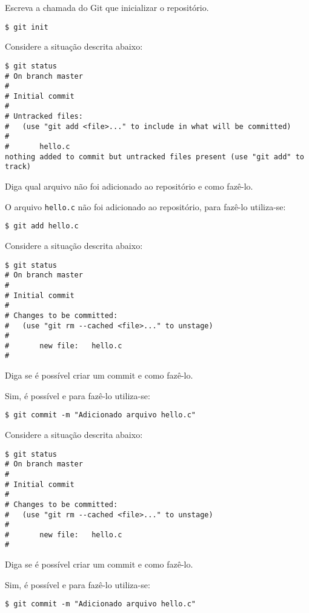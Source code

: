 \begin{Exercise}[label={0008}, difficulty={1}, origin={git}]
  Escreva a chamada do Git que inicializar o repositório.
\end{Exercise}
\begin{Answer}[ref={0008}]
  \begin{lstlisting}
$ git init
  \end{lstlisting}
\end{Answer}

\begin{Exercise}[label={0009}, difficulty={1}, origin={git}]
  Considere a situação descrita abaixo:
  \begin{lstlisting}
$ git status
# On branch master
#
# Initial commit
#
# Untracked files:
#   (use "git add <file>..." to include in what will be committed)
#
#       hello.c
nothing added to commit but untracked files present (use "git add" to track)
  \end{lstlisting}
  Diga qual arquivo não foi adicionado ao repositório e como fazê-lo.
\end{Exercise}
\begin{Answer}[ref={0009}]
  O arquivo \lstinline+hello.c+ não foi adicionado ao repositório, para fazê-lo
  utiliza-se:
  \begin{lstlisting}
$ git add hello.c
  \end{lstlisting}
\end{Answer}

\begin{Exercise}[label={0010}, difficulty={1}, origin={git}]
  Considere a situação descrita abaixo:
  \begin{lstlisting}
$ git status
# On branch master
#
# Initial commit
#
# Changes to be committed:
#   (use "git rm --cached <file>..." to unstage)
#
#       new file:   hello.c
#
  \end{lstlisting}
  Diga se é possível criar um commit e como fazê-lo.
\end{Exercise}
\begin{Answer}[ref={0010}]
  Sim, é possível e para fazê-lo utiliza-se:
  \begin{lstlisting}
$ git commit -m "Adicionado arquivo hello.c"
  \end{lstlisting}
\end{Answer}

\begin{Exercise}[label={0011}, difficulty={1}, origin={git}]
  Considere a situação descrita abaixo:
  \begin{lstlisting}
$ git status
# On branch master
#
# Initial commit
#
# Changes to be committed:
#   (use "git rm --cached <file>..." to unstage)
#
#       new file:   hello.c
#
  \end{lstlisting}
  Diga se é possível criar um commit e como fazê-lo.
\end{Exercise}
\begin{Answer}[ref={0011}]
  Sim, é possível e para fazê-lo utiliza-se:
  \begin{lstlisting}
$ git commit -m "Adicionado arquivo hello.c"
  \end{lstlisting}
\end{Answer}

